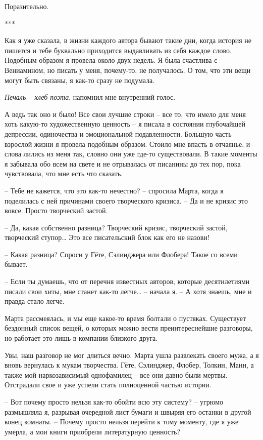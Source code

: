 \documentclass[
]{book}
\begin{document}
Поразительно.

***

Как я уже сказала, в жизни каждого автора бывают такие дни, когда история не пишется и тебе буквально приходится выдавливать из себя каждое слово. Подобным образом я провела около двух недель. Я была счастлива с Вениамином, но писать у меня, почему-то, не получалось. О том, что эти вещи могут быть связаны, я как-то сразу не подумала.

\emph{Печаль -- хлеб поэта}, напомнил мне внутренний голос.

А ведь так оно и было! Все свои лучшие строки -- все то, что имело для меня хоть какую-то художественную ценность -- я писала в состоянии глубочайшей депрессии, одиночества и эмоциональной подавленности. Большую часть взрослой жизни я провела подобным образом. Стоило мне впасть в отчаянье, и слова лились из меня так, словно они уже где-то существовали. В такие моменты я забывала обо всем на свете и не отрывалась от писанины до тех пор, пока чувствовала, что мне есть что сказать.

-- Тебе не кажется, что это как-то нечестно? -- спросила Марта, когда я поделилась с ней причинами своего творческого кризиса. -- Да и не кризис это вовсе. Просто творческий застой.

-- Да, какая собственно разница? Творческий кризис, творческий застой, творческий ступор\ldots{} Это все писательский блок как его не назови!

-- Какая разница? Спроси у Гёте, Сэлинджера или Флобера! Такое со всеми бывает.

-- Если ты думаешь, что от перечня известных авторов, которые десятилетиями писали свои хиты, мне станет как-то легче\ldots{} -- начала я. -- А хотя знаешь, мне и правда стало легче.

Марта рассмеялась, и мы еще какое-то время болтали о пустяках. Существует бездонный список вещей, о которых можно вести преинтереснейшие разговоры, но работает это лишь в компании близкого друга.

Увы, наш разговор не мог длиться вечно. Марта ушла развлекать своего мужа, а я вновь вернулась к мукам творчества. Гёте, Сэлинджер, Флобер, Толкин, Манн, а также мой наркозависимый однофамилец -- все они давно были мертвы. Отстрадали свое и уже успели стать полноценной частью истории.

-- Вот почему просто нельзя как-то обойти всю эту систему? -- угрюмо размышляла я, разрывая очередной лист бумаги и швыряя его останки в другой конец комнаты. -- Почему просто нельзя перейти к тому моменту, где я уже умерла, а мои книги приобрели литературную ценность?
\end{document}
